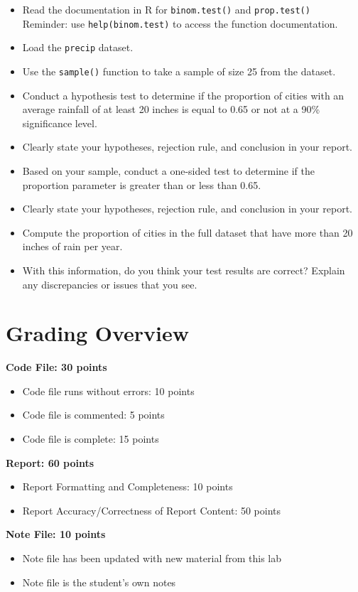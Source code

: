 \documentclass{article}
\begin{document}
\begin{itemize}
    \item Read the documentation in R for \texttt{binom.test()} and \texttt{prop.test()} \\
    Reminder: use \texttt{help(binom.test)} to access the function documentation.
    \item Load the \texttt{precip} dataset.
    \item Use the \texttt{sample()} function to take a sample of size 25 from the dataset.
    \item Conduct a hypothesis test to determine if the proportion of cities with an average rainfall of at least 20 inches is equal to 0.65 or not at a 90\% significance level.
    \item Clearly state your hypotheses, rejection rule, and conclusion in your report.
    \item Based on your sample, conduct a one-sided test to determine if the proportion parameter is greater than or less than 0.65. 
    \item Clearly state your hypotheses, rejection rule, and conclusion in your report.
    \item Compute the proportion of cities in the full dataset that have more than 20 inches of rain per year.
    \item With this information, do you think your test results are correct? Explain any discrepancies or issues that you see.
\end{itemize}
\newpage
\section*{Grading Overview}

\textbf{Code File: 30 points}
\begin{itemize}
    \item Code file runs without errors: 10 points
    \item Code file is commented: 5 points
    \item Code file is complete: 15 points
\end{itemize}

\textbf{Report: 60 points}
\begin{itemize}
    \item Report Formatting and Completeness: 10 points
    \item Report Accuracy/Correctness of Report Content: 50 points
\end{itemize}

\textbf{Note File: 10 points}
\begin{itemize}
    \item Note file has been updated with new material from this lab
    \item Note file is the student’s own notes
\end{itemize}
\end{document}
